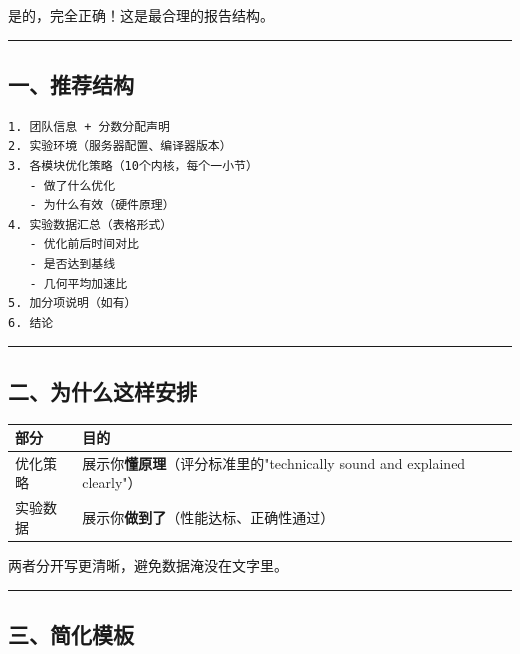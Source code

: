 \documentclass[11pt, a4paper]{article}
\begin{document}
\begin{aibox}
是的，完全正确！这是最合理的报告结构。

\begin{center}\rule{\textwidth}{0.4pt}\end{center}

\subsection*{一、推荐结构}

\begin{tcolorbox}[colback=white,colframe=gray!50!white,boxrule=0.5pt,arc=2pt,left=5pt,right=5pt,top=5pt,bottom=5pt]
\begin{verbatim}
1. 团队信息 + 分数分配声明
2. 实验环境（服务器配置、编译器版本）
3. 各模块优化策略（10个内核，每个一小节）
   - 做了什么优化
   - 为什么有效（硬件原理）
4. 实验数据汇总（表格形式）
   - 优化前后时间对比
   - 是否达到基线
   - 几何平均加速比
5. 加分项说明（如有）
6. 结论
\end{verbatim}
\end{tcolorbox}

\begin{center}\rule{\textwidth}{0.4pt}\end{center}

\subsection*{二、为什么这样安排}

\vspace{0.5em}
\begin{tabularx}{\textwidth}{@{} l X @{}}
\toprule
部分 & 目的 \\
\midrule
优化策略 & 展示你\textbf{懂原理}（评分标准里的"technically sound and explained clearly"） \\
实验数据 & 展示你\textbf{做到了}（性能达标、正确性通过） \\
\bottomrule
\end{tabularx}
\vspace{0.5em}

两者分开写更清晰，避免数据淹没在文字里。

\begin{center}\rule{\textwidth}{0.4pt}\end{center}

\subsection*{三、简化模板}


\end{aibox}
\end{document}
